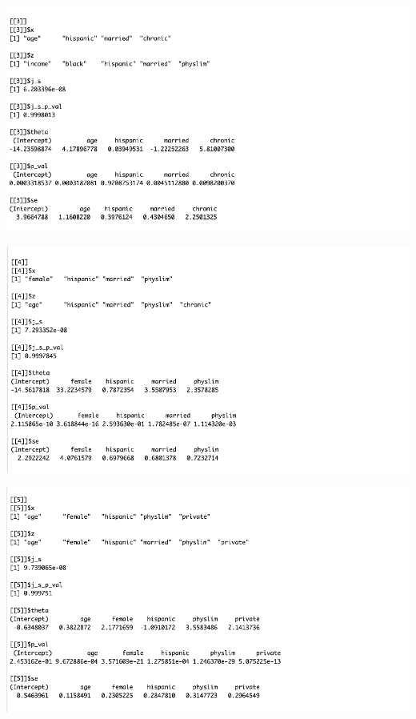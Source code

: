 \documentclass[12pt]{article}
\begin{document}
\includegraphics{3.png}

\includegraphics{4.png}

\includegraphics{5.png}



\newpage
\end{document}
